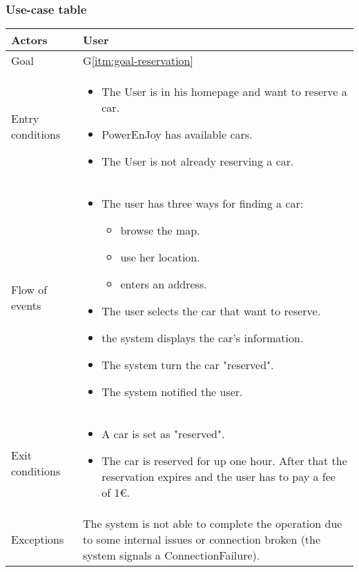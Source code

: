 \newpage
\subsubsection{Use-case table}
\begin{center}
  \begin{tabular}{ l | p{10cm} }
    \hline
    Actors & User\\ \hline
    Goal & G\ref{itm:goal-reservation}\\ \hline
    Entry conditions & \begin{itemize}
			\item The User is in his homepage and want to reserve a car.
			\item PowerEnJoy has available cars.
			\item The User is not already reserving a car.
\end{itemize}  \\ \hline
    Flow of events &
\begin{itemize}
\item The user has three ways for finding a car:
\begin{itemize}
			\item browse the map.
			\item use her location.
			\item enters an address.
\end{itemize}
\item The user selects the car that want to reserve.
\item the system displays the car's information.%
\item The system turn the car "reserved".%
\item The system notified the user.
\end{itemize} \\ \hline
    Exit conditions &
\begin{itemize}
	\item A car is set as "reserved".
	\item The car is reserved for up one hour. After that the reservation expires and the user has to pay a fee of 1€.
\end{itemize}  \\ \hline
  Exceptions & 

The system is not able to complete the operation due to some internal issues or connection broken (the system signals a ConnectionFailure).%
\\ \hline
  \end{tabular}
\end{center}


